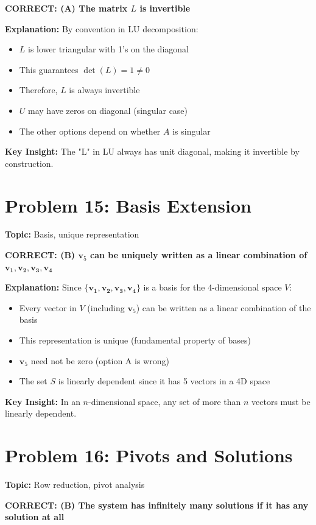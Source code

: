 \documentclass[12pt]{amsart}
\newcommand{\correct}[1]{{\color{blue}\textbf{CORRECT: #1}}}
\newcommand{\hint}{\textbf{Key Insight: }}
\begin{document}
\correct{(A) The matrix $L$ is invertible}

\textbf{Explanation:} By convention in LU decomposition:
\begin{itemize}
\item $L$ is lower triangular with 1's on the diagonal
\item This guarantees $\det(L) = 1 \neq 0$
\item Therefore, $L$ is always invertible
\item $U$ may have zeros on diagonal (singular case)
\item The other options depend on whether $A$ is singular
\end{itemize}

\hint The "L" in LU always has unit diagonal, making it invertible by construction.

\hrulefill

\section*{Problem 15: Basis Extension}
\textbf{Topic:} Basis, unique representation

\correct{(B) $\mathbf{v}_5$ can be uniquely written as a linear combination of $\mathbf{v_1, v_2, v_3, v_4}$}

\textbf{Explanation:} Since $\{\mathbf{v_1, v_2, v_3, v_4}\}$ is a basis for the 4-dimensional space $V$:
\begin{itemize}
\item Every vector in $V$ (including $\mathbf{v}_5$) can be written as a linear combination of the basis
\item This representation is unique (fundamental property of bases)
\item $\mathbf{v}_5$ need not be zero (option A is wrong)
\item The set $S$ is linearly dependent since it has 5 vectors in a 4D space
\end{itemize}

\hint In an $n$-dimensional space, any set of more than $n$ vectors must be linearly dependent.

\hrulefill

\section*{Problem 16: Pivots and Solutions}
\textbf{Topic:} Row reduction, pivot analysis

\correct{(B) The system has infinitely many solutions if it has any solution at all}
\end{document}
